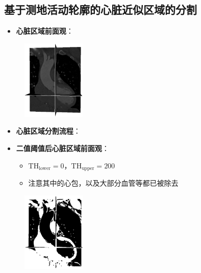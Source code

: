 \subsection[心脏分割]{基于测地活动轮廓的心脏近似区域的分割}

\begin{frame}
\begin{itemize}
  \item \textbf{心脏区域前面观}：
\end{itemize}
\begin{figure}[t]
\centering
\includegraphics[height=1.5in]{../../Figures/gac/heart/original.eps}
\end{figure}
\end{frame}

\begin{frame}
\begin{itemize}
  \item \textbf{心脏区域分割流程}：
\end{itemize}
\begin{figure}[t]
\centering

\end{figure}
\end{frame}

\begin{frame}
\begin{itemize}
  \item \textbf{二值阈值后心脏区域前面观}：
  \begin{itemize}
    \item $\text{TH}_{\text{lower}} = 0$，$\text{TH}_{\text{upper}} = 200$
    \item 注意其中的心包，以及大部分血管等都已被除去
  \end{itemize}
\end{itemize}
\begin{figure}[t]
\centering
\includegraphics[height=1.5in]{../../Figures/gac/heart/binary_threshold.eps}
\end{figure}
\end{frame}


